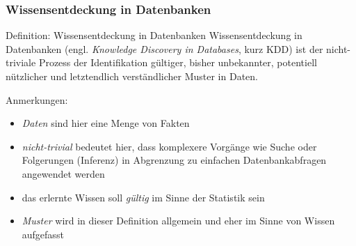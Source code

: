 \begin{frame}
\frametitle{Wissensentdeckung in Datenbanken}
\begin{block}{Definition: Wissensentdeckung in Datenbanken}
Wissensentdeckung in Datenbanken (engl. \textit{Knowledge Discovery in Databases}, kurz KDD) ist der nicht-triviale Prozess der Identifikation gültiger, bisher unbekannter, potentiell nützlicher und letztendlich verständlicher Muster in Daten.\cite{fayyad_data_1996}
\end{block}
Anmerkungen:
        \begin{itemize}[<+->]
        	\item \textit{Daten} sind hier eine Menge von Fakten
            \item \textit{nicht-trivial} bedeutet hier, dass komplexere Vorgänge wie Suche oder Folgerungen 
(Inferenz) in Abgrenzung zu einfachen Datenbankabfragen angewendet werden
            \item das erlernte Wissen soll \textit{gültig} im Sinne der Statistik sein
            \item \textit{Muster} wird in dieser Definition allgemein und eher im Sinne von Wissen aufgefasst
        \end{itemize}
\end{frame}

